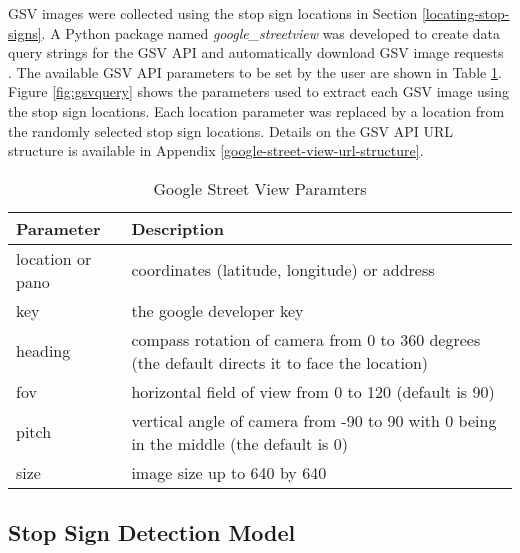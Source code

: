 GSV images were collected using the stop sign locations in Section \ref{locating-stop-signs}. A Python package named \textit{google\_streetview} was developed to create data query strings for the GSV API and automatically download GSV image requests \cite{Wen:2017}. The available GSV API parameters to be set by the user are shown in Table \ref{table:gsvapi}. Figure \ref{fig:gsvquery} shows the parameters used to extract each GSV image using the stop sign locations. Each location parameter was replaced by a location from the randomly selected stop sign locations. Details on the GSV API URL structure is available in Appendix \ref{google-street-view-url-structure}.

\begin{table}
\begin{center}
\begin{tabular}{ | p{5cm} | p{5cm} |}
\hline
\textbf{Parameter} & \textbf{Description} \\ 
\hline
location or pano & coordinates (latitude, longitude) or address \\ 
\hline
key & the google developer key \\ 
\hline
heading &  compass rotation of camera from 0 to 360 degrees (the default directs it to face the location)\\ 
\hline
fov & horizontal field of view from 0 to 120 (default is 90) \\
\hline
pitch & vertical angle of camera from -90 to 90 with 0 being in the middle (the default is 0) \\
\hline
size & image size up to 640 by 640\\
\hline
\end{tabular}
\caption{Google Street View Paramters}
\label{table:gsvapi}
\end{center}
\end{table}

\subsection{Stop Sign Detection Model} \label{stop-sign-detection-model}

